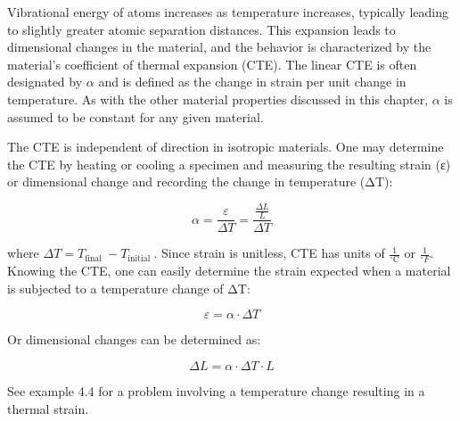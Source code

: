 \documentclass[
  letterpaper,
  DIV=11,
  numbers=noendperiod]{scrreprt}
\begin{document}
Vibrational energy of atoms increases as temperature increases,
typically leading to slightly greater atomic separation distances. This
expansion leads to dimensional changes in the material, and the behavior
is characterized by the material's coefficient of thermal expansion
(CTE). The linear CTE is often designated by \(\alpha\) and is defined
as the change in strain per unit change in temperature. As with the
other material properties discussed in this chapter, \(\alpha\) is
assumed to be constant for any given material.

The CTE is independent of direction in isotropic materials. One may
determine the CTE by heating or cooling a specimen and measuring the
resulting strain (ε) or dimensional change and recording the change in
temperature (ΔT):

\[
\alpha=\frac{\varepsilon}{\Delta T}=\frac{\frac{\Delta L}{L}}{\Delta T}
\]

where \(\Delta T=T_{\text {final }}-T_{\text {initial }}\). Since strain
is unitless, CTE has units of \(\frac{1}{{ }^{\circ} \mathrm{C}}\) or
\(\frac{1}{{ }^{\circ} F}\). Knowing the CTE, one can easily determine
the strain expected when a material is subjected to a temperature change
of ΔT:

\[
\varepsilon=\alpha \cdot \Delta T
\]

Or dimensional changes can be determined as:

\[
\Delta L=\alpha \cdot \Delta T \cdot L
\]

See example 4.4 for a problem involving a temperature change resulting
in a thermal strain.
\end{document}
